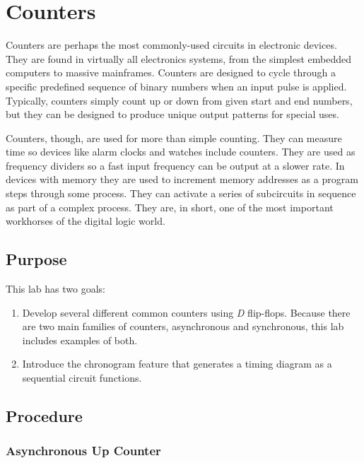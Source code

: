 \chapter{Counters}

Counters are perhaps the most commonly-used circuits in electronic devices. They are found in virtually all electronics systems, from the simplest embedded computers to massive mainframes. Counters are designed to cycle through a specific predefined sequence of binary numbers when an input pulse is applied. Typically, counters simply count up or down from given start and end numbers, but they can be designed to produce unique output patterns for special uses. 

Counters, though, are used for more than simple counting. They can measure time so devices like alarm clocks and watches include counters. They are used as frequency dividers so a fast input frequency can be output at a slower rate. In devices with memory they are used to increment memory addresses as a program steps through some process. They can activate a series of subcircuits in sequence as part of a complex process. They are, in short, one of the most important workhorses of the digital logic world.

\section{Purpose}

This lab has two goals: 

\begin{enumerate}
	\item Develop several different common counters using \textit{D} flip-flops. Because there are two main families of counters, asynchronous and synchronous, this lab includes examples of both. 
	\item Introduce the \LE chronogram feature that generates a timing diagram as a sequential circuit functions. 
\end{enumerate}

\section{Procedure}

\subsection{Asynchronous Up Counter}

